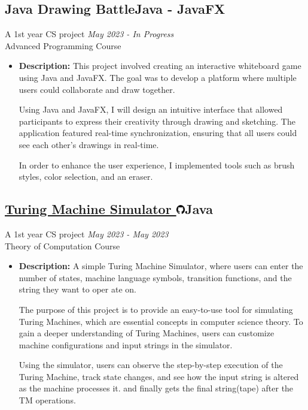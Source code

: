 \documentclass[a4paper,12pt]{article}
\newcommand{\projectTitle}[3]{%
    \subsection{\href{#2}{#1 \includegraphics[height=11pt]{images/github-logo.png}}\textmd{\hfill \normalsize{#3}}}
}
\begin{document}
	 	\subsection{{Java Drawing Battle}\textmd{\hfill \normalsize{Java - JavaFX}}}	
			\vspace{-3mm}
			A 1st year CS project \hfill \small\textit{May 2023 - In Progress}\\
			Advanced Programming Course
			\begin{itemize}
				\item{\textbf{Description: }This project involved creating an interactive whiteboard game using Java and JavaFX. The goal was to develop a platform where multiple users could collaborate and draw together.

Using Java and JavaFX, I will design an intuitive interface that allowed participants to express their creativity through drawing and sketching. The application featured real-time synchronization, ensuring that all users could see each other's drawings in real-time.

In order to enhance the user experience, I implemented tools such as brush styles, color selection, and an eraser.}
			\end{itemize}	

		\projectTitle{Turing Machine Simulator}{https://github.com/OmarMGaber/Turing-Machine-Simulator}{Java}
			\vspace{-3mm}
			A 1st year CS project \hfill \small\textit{May 2023 - May 2023}\\
			Theory of Computation Course
			\begin{itemize}													%
				\item{\textbf{Description: }A simple Turing Machine Simulator, where users can enter the number of states, machine language symbols, transition functions, and the string they want to oper	ate on.

The purpose of this project is to provide an easy-to-use tool for simulating Turing Machines, which are essential concepts in computer science theory. To gain a deeper understanding of Turing Machines, users can customize machine configurations and input strings in the simulator.

Using the simulator, users can observe the step-by-step execution of the Turing Machine, track state changes, and see how the input string is altered as the machine processes it. and finally gets the final string(tape) after the TM operations. }
			\end{itemize}
	
\end{document}
